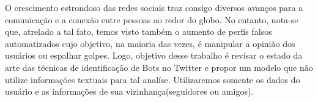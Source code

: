 O crescimento estrondoso das redes sociais traz consigo diversos avanços para a comunicação e a conexão entre pessoas ao redor do globo. No entanto, nota-se que, atrelado a tal fato, temos visto também o aumento de perfis falsos automatizados cujo objetivo, na maioria das vezes, é manipular a opinião dos usuários ou espalhar golpes. Logo, objetivo desse trabalho é revisar o estado da arte das técnicas de identificação de Bots no Twitter e propor um modelo que não utilize informações textuais para tal analíse. Utilizaremos somente os dados do usuário e as informações de sua vizinhança(seguidores ou amigos).